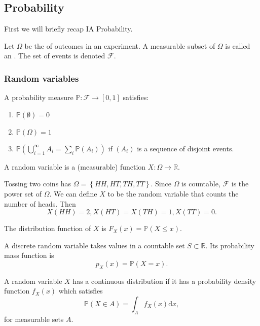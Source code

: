 \documentclass[a4paper]{scrartcl}
\begin{document}
\subsection{Probability}
First we will briefly recap IA Probability.

Let $\Omega$ be the  of outcomes in an experiment. A measurable subset of $\Omega$ is called an . The set of events is denoted $\mathcal{F}$. 
\subsubsection*{Random variables}
\begin{definition*}
     A probability measure $\mathbb{P}: \mathcal{F} \rightarrow [0,1]$ satisfies:
     \begin{enumerate}
         \item $\mathbb{P} (\emptyset)=0$ 
         \item $\mathbb{P}(\Omega)=1$
         \item $\mathbb{P}\left(\bigcup_{i=1}^{\infty} A_i= \sum_{i}^{}\mathbb{P} (A_i)\right)$ if $(A_i)$ is a sequence of disjoint events.   
     \end{enumerate} 
\end{definition*}
\begin{definition*}
     A random variable is a (measurable) function $X: \Omega \rightarrow \mathbb{R}$.
\end{definition*}
\begin{example*}
     Tossing two coins has $\Omega= \left\{HH,HT,TH,TT\right\}$. Since $\Omega$ is countable, $\mathcal{F}$ is the power set of $\Omega$. We can define $X$ to be the random variable that counts the number of heads. Then \[
     X (HH)=2, X (HT)=X (TH)=1, X (TT)=0
     .\] 
\end{example*}
\begin{definition*}
     The distribution function of $X$ is $F_X (x)=\mathbb{P} (X \leq x)$.
\end{definition*}
\begin{definition*}
     A discrete random variable takes values in a countable set $S \subset \mathbb{R}$. Its probability mass function is \[
          p_X (x)=\mathbb{P}(X=x)
          .\] 
     
     A random variable $X$ has a continuous distribution if it has a probability density function $f_X (x)$ which satisfies \[
          \mathbb{P} (X \in A)=\int_A f_X (x) \mathrm{d}x
     ,\]
     for measurable sets $A$. 
\end{definition*}
\end{document}
